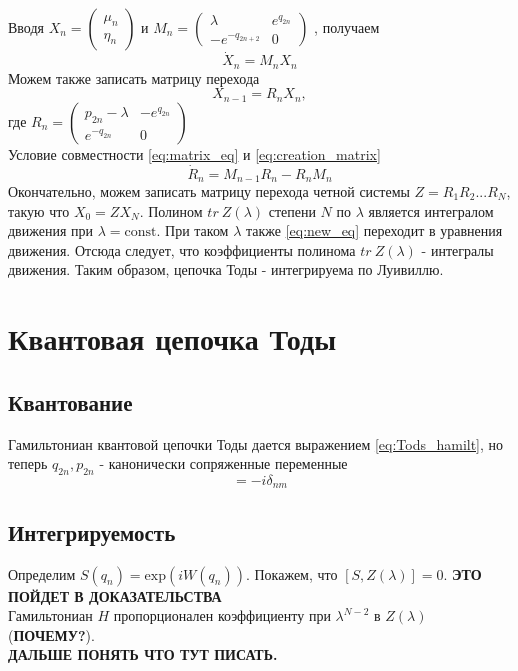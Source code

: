 \documentclass[12pt]{article}
\begin{document}
Вводя $X_n = 
\begin{pmatrix}
    \mu_n \\
    \eta_n
\end{pmatrix} 
$ и $M_n = 
\begin{pmatrix}
    \lambda & e^{q_{2n}} \\
    -e^{-q_{2n + 2}} & 0
\end{pmatrix}
$
, получаем
\begin{equation}\label{eq:matrix_eq}
    \dot{X}_n = M_n X_n
\end{equation}
Можем также записать матрицу перехода 
\begin{equation}\label{eq:creation_matrix}
X_{n-1} = R_n X_n,   
\end{equation}
где $R_n = 
\begin{pmatrix}
    p_{2n} - \lambda & -e^{q_{2n}} \\
    e^{-q_{2n}} & 0
\end{pmatrix}
$ \\
Условие совместности \eqref{eq:matrix_eq} и \eqref{eq:creation_matrix} 
\begin{equation}
    \dot{R}_n = M_{n-1}R_n - R_n M_n
\end{equation}
Окончательно, можем записать матрицу перехода четной системы $Z = R_1 R_2 ... R_N$, такую что $X_0 = Z X_N$. 
Полином $tr \ Z(\lambda)$ степени $N$ по $\lambda$ является интегралом движения при $\lambda = \text{const}$. При таком $\lambda$ также \eqref{eq:new_eq} переходит в уравнения движения.
Отсюда следует, что коэффициенты полинома $tr \ Z(\lambda)$ - интегралы движения. Таким образом, цепочка Тоды - интегрируема по Луивиллю. 
\section{Квантовая цепочка Тоды}
\subsection{Квантование}
Гамильтониан квантовой цепочки Тоды дается выражением \eqref{eq:Tods_hamilt}, но теперь $q_{2n}, p_{2n}$ - канонически сопряженные переменные
\begin{equation}
    [p_{2n}, q_{2m}] = - i \delta_{nm}
\end{equation} 
\subsection{Интегрируемость}
Определим $S(q_{n}) = \text{exp}(i W(q_n))$. Покажем, что $[S, Z(\lambda)] = 0$. \textbf{ЭТО ПОЙДЕТ В ДОКАЗАТЕЛЬСТВА} \\ 
Гамильтониан $H$ пропорционален коэффициенту при $\lambda^{N-2}$ в $Z(\lambda)$ (\textbf{ПОЧЕМУ?}).\\
\textbf{ДАЛЬШЕ ПОНЯТЬ ЧТО ТУТ ПИСАТЬ.}
\end{document}

